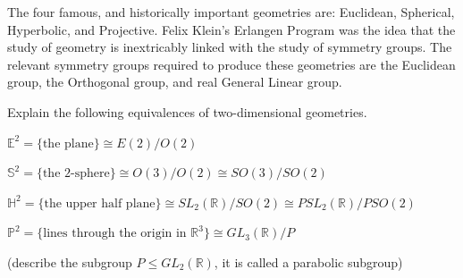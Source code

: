 \documentclass[11pt]{article}
\newcommand{\R}{\mathbb{R}}
\begin{document}
\begin{problem}
  The four famous, and historically important geometries are: Euclidean,
  Spherical, Hyperbolic, and Projective. Felix Klein's Erlangen Program was
  the idea that the study of geometry is inextricably linked with the study of
  symmetry groups. The relevant symmetry groups required to produce these
  geometries are the Euclidean group, the Orthogonal group, and real General
  Linear group.

  Explain the following equivalences of two-dimensional geometries.
  \begin{parts}

  \item $\mathbb{E}^2 = \{\text{the plane}\} \cong E(2)/O(2)$
    \begin{solution}

    \end{solution}

  \item $\mathbb{S}^2 = \{\text{the 2-sphere}\} \cong O(3)/O(2) \cong
    SO(3)/SO(2)$
    \begin{solution}

    \end{solution}

  \item $\mathbb{H}^2 = \{\text{the upper half plane}\} \cong
    SL_2(\R)/SO(2) \cong PSL_2(\R)/PSO(2)$
    \begin{solution}

    \end{solution}

  \item $\mathbb{P}^2 = \{\text{lines through the origin in } \R^3\}
    \cong GL_3(\R)/P$

    (describe the subgroup $P \le GL_2(\R)$, it is called a parabolic
    subgroup)
    \begin{solution}

    \end{solution}

  \end{parts}
\end{problem}
\end{document}
